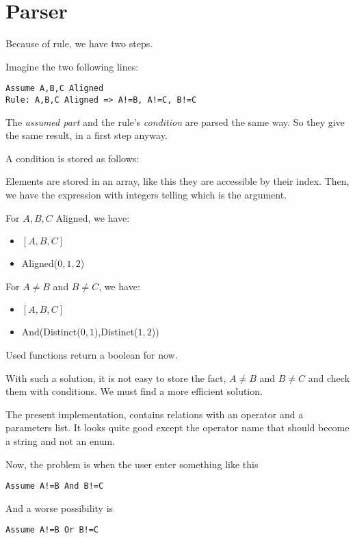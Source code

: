 \documentclass[a4paper]{article}
\begin{document}
\section{Parser}

Because of rule, we have two steps.

Imagine the two following lines:
\begin{verbatim}
Assume A,B,C Aligned
Rule: A,B,C Aligned => A!=B, A!=C, B!=C
\end{verbatim}

The \textit{assumed part} and the rule's \textit{condition} are parsed the same way. So they give the same result, in a first step anyway.

A condition is stored as follows:

Elements are stored in an array, like this they are accessible by their index. Then, we have the expression with integers telling which is the argument.

For $A,B,C$ Aligned, we have:
\begin{itemize}
\item $[A, B, C]$
\item Aligned($0, 1, 2$)
\end{itemize}

For $A\neq B$ and $B \neq C$, we have:
\begin{itemize}
\item $[A,B,C]$
\item And(Distinct($0,1$),Distinct($1,2$))
\end{itemize}

Used functions return a boolean for now.

With such a solution, it is not easy to store the fact, $A\neq B$ and $B\neq C$ and check them with conditions. We must find a more efficient solution.

The present implementation, contains relations with an operator and a parameters list. It looks quite good except the operator name that should become a string and not an enum.

Now, the problem is when the user enter something like this

\begin{verbatim}
Assume A!=B And B!=C
\end{verbatim}

And a worse possibility is

\begin{verbatim}
Assume A!=B Or B!=C
\end{verbatim}
\end{document}
